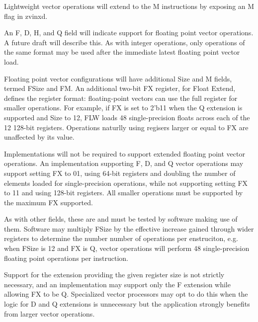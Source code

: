 \begin{commentary}
    Lightweight vector operations will extend to the M instructions by exposing
    an M flag in zvinxd.

    An F, D, H, and Q field will indicate support for floating point vector
    operations.  A future draft will describe this.  As with integer operations,
    only operations of the same format may be used after the immediate latest
    floating point vector load.

    Floating point vector configurations will have additional Size and M fields,
    termed FSize and FM.  An additional two-bit FX register, for Float Extend,
    defines the register format:  floating-point vectors can use the full
    register for smaller operations.  For example, if FX is set to 2'b11 when
    the Q extension is supported and Size to 12, FLW loads 48 single-precision
    floats across each of the 12 128-bit registers.  Operations naturlly using
    regisers larger or equal to FX are unaffected by its value.

    Implementations will not be required to support extended floating point
    vector operations.  An implementation supporting F, D, and Q vector
    operations may support setting FX to 01, using 64-bit registers and
    doubling the number of elements loaded for single-precision operations,
    while not supporting setting FX to 11 and using 128-bit registers.
    All smaller operations must be supported by the maximum FX supported.

    As with other fields, these are {\warl} and must be tested by software
    making use of them.  Software may multiply FSize by the effective increase
    gained through wider registers to determine the number number of
    operations per enstruciton, e.g. when FSize is 12 and FX is Q, vector
    operations will perform 48 single-precision floating point operations per
    instruction.

    Support for the extension providing the given register size is not
    strictly necessary, and an implementation may support only the F
    extension while allowing FX to be Q.  Specialized vector processors
    may opt to do this when the logic for D and Q extensions is unnecessary
    but the application strongly benefits from larger vector operations.

\end{commentary}

